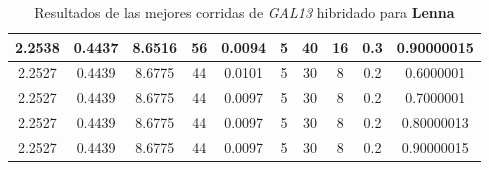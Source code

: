\begin{table}[h!]
\begin{center}
\begin{tabular}{|c|c|c|c|c|c|c|c|c|c|}
        \hline
        \hline
            2.2538 & 0.4437  & 8.6516 & 56 & 0.0094 & 5 & 40 & 16 & 0.3 & 0.90000015\\
        \hline
        \hline
            2.2527 & 0.4439  & 8.6775 & 44 & 0.0101 & 5 & 30 & 8 & 0.2 & 0.6000001\\
        \hline
        \hline
            2.2527 & 0.4439  & 8.6775 & 44 & 0.0097 & 5 & 30 & 8 & 0.2 & 0.7000001\\
        \hline
        \hline
            2.2527 & 0.4439  & 8.6775 & 44 & 0.0097 & 5 & 30 & 8 & 0.2 & 0.80000013\\
        \hline
        \hline
            2.2527 & 0.4439  & 8.6775 & 44 & 0.0097 & 5 & 30 & 8 & 0.2 & 0.90000015\\
        \hline
        \end{tabular}
        \caption{Resultados de las mejores corridas de \emph{GAL13} hibridado para {\bf Lenna}}
        \label{tb:tableGAL13}
    \end{center}
\end{table}
